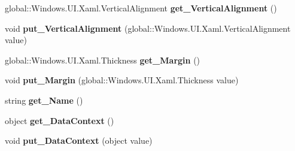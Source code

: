 \begin{DoxyCompactItemize}
\item 
\mbox{\label{interface_windows_1_1_u_i_1_1_xaml_1_1_i_framework_element_a5c99e9c5ee87e9df550209699e7666f7}} 
global\+::\+Windows.\+U\+I.\+Xaml.\+Vertical\+Alignment {\bfseries get\+\_\+\+Vertical\+Alignment} ()
\item 
\mbox{\label{interface_windows_1_1_u_i_1_1_xaml_1_1_i_framework_element_aad18ff5b25e09bbbcc7f6a3b5519e4ab}} 
void {\bfseries put\+\_\+\+Vertical\+Alignment} (global\+::\+Windows.\+U\+I.\+Xaml.\+Vertical\+Alignment value)
\item 
\mbox{\label{interface_windows_1_1_u_i_1_1_xaml_1_1_i_framework_element_a4b7dbc2a4b60e47ea9bfe8bc5ee3ad33}} 
global\+::\+Windows.\+U\+I.\+Xaml.\+Thickness {\bfseries get\+\_\+\+Margin} ()
\item 
\mbox{\label{interface_windows_1_1_u_i_1_1_xaml_1_1_i_framework_element_a38f9babd2b0b51bb24956c953463c95b}} 
void {\bfseries put\+\_\+\+Margin} (global\+::\+Windows.\+U\+I.\+Xaml.\+Thickness value)
\item 
\mbox{\label{interface_windows_1_1_u_i_1_1_xaml_1_1_i_framework_element_a1e142daabb976702923de9dd5bad0e79}} 
string {\bfseries get\+\_\+\+Name} ()
\item 
\mbox{\label{interface_windows_1_1_u_i_1_1_xaml_1_1_i_framework_element_a85f9478adc486dc6da6301bf424b0bec}} 
object {\bfseries get\+\_\+\+Data\+Context} ()
\item 
\mbox{\label{interface_windows_1_1_u_i_1_1_xaml_1_1_i_framework_element_a61847908f27c9feb7e9307fccd243aa7}} 
void {\bfseries put\+\_\+\+Data\+Context} (object value)
\item 
\mbox{\label{interface_windows_1_1_u_i_1_1_xaml_1_1_i_framework_element_a8acb2f4d3cfe85560c75cdba3730e2dc}} 

\end{DoxyCompactItemize}
